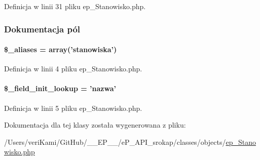 Definicja w linii 31 pliku ep\-\_\-\-Stanowisko.\-php.



\subsubsection{Dokumentacja pól}
\hypertarget{classep___stanowisko_ab4e31d75f0bc5d512456911e5d01366b}{
\paragraph[{\$\-\_\-aliases}]{\setlength{\rightskip}{0pt plus 5cm}\$\-\_\-aliases = array('stanowiska')}}\label{classep___stanowisko_ab4e31d75f0bc5d512456911e5d01366b}


Definicja w linii 4 pliku ep\-\_\-\-Stanowisko.\-php.

\hypertarget{classep___stanowisko_a4a4d54ae35428077a7c61ec8a5139af3}{
\paragraph[{\$\-\_\-field\-\_\-init\-\_\-lookup}]{\setlength{\rightskip}{0pt plus 5cm}\$\-\_\-field\-\_\-init\-\_\-lookup = 'nazwa'}}\label{classep___stanowisko_a4a4d54ae35428077a7c61ec8a5139af3}


Definicja w linii 5 pliku ep\-\_\-\-Stanowisko.\-php.



Dokumentacja dla tej klasy została wygenerowana z pliku\-:\begin{DoxyCompactItemize}
\item 
/\-Users/veri\-Kami/\-Git\-Hub/\-\_\-\-\_\-\-E\-P\-\_\-\-\_\-/e\-P\-\_\-\-A\-P\-I\-\_\-srokap/classes/objects/\hyperlink{ep___stanowisko_8php}{ep\-\_\-\-Stanowisko.\-php}\end{DoxyCompactItemize}
